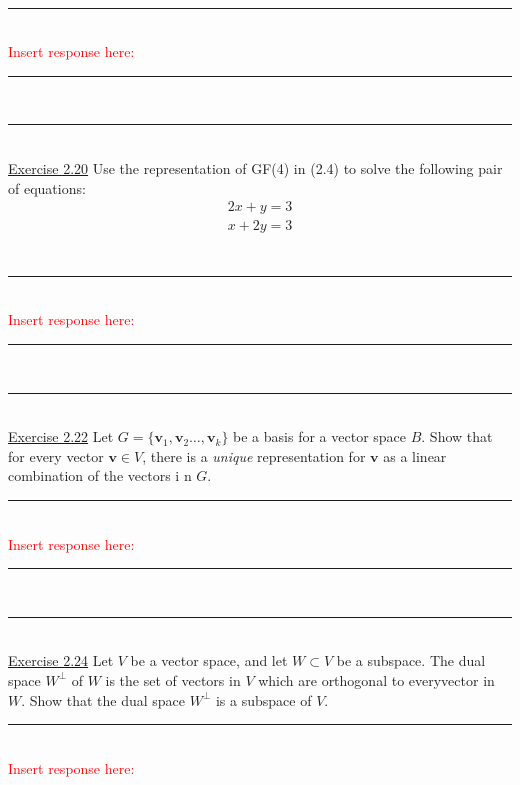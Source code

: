 \documentclass{article}
\newcommand{\problemsep}{\leavevmode\\[0.05in] \rule[\baselineskip/4]{\textwidth}{1pt} \\[0.005in] \rule[\baselineskip]{\textwidth}{1pt}\vspace{-\baselineskip}\leavevmode\\[0.05in]}
\newcommand{\statementsep}{\leavevmode\\[0.005in] \rule[\baselineskip/4]{\textwidth}{0.4pt}\leavevmode\\[0.005in]}
\begin{document}
\statementsep
\textcolor{red}{Insert response here: }
\problemsep
\noindent\underline{Exercise 2.20}
Use the representation of GF(4) in (2.4) to solve the following pair of equations:
\begin{equation*} \begin{aligned}
2x + y = 3 \\
x + 2y = 3 \\
\end{aligned}\end{equation*}
\statementsep
\textcolor{red}{Insert response here: }
\problemsep
\noindent\underline{Exercise 2.22}
Let $G = \{\mathbf{v}_1, \mathbf{v}_2 \hdots, \mathbf{v}_k \}$ be a basis for a vector space $B$. Show that for every vector $\mathbf{v} \in V$, there is a {\it unique} representation for $\mathbf{v}$ as a linear combination of the vectors i n $G$.
\statementsep
\textcolor{red}{Insert response here: }
\problemsep
\noindent\underline{Exercise 2.24}
Let $V$ be a vector space, and let $W \subset V$ be a subspace. The dual space $W^{\perp}$ of $W$ is the set of vectors in $V$ which are orthogonal to everyvector in $W$. Show that the dual space $W^{\perp}$ is a subspace of $V$.  
\statementsep
\textcolor{red}{Insert response here: }
\end{document}

